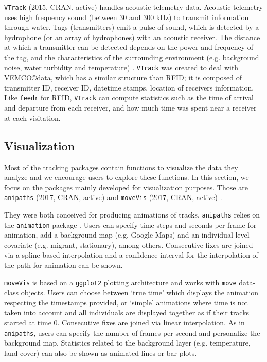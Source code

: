 \documentclass[a4paper,12pt]{article}
\newcommand{\Rpkg}[1]{\texttt{#1}}
\begin{document}
	\Rpkg{VTrack} (2015, CRAN, active) \citep{Campbell2012} handles acoustic telemetry data. Acoustic telemetry uses high frequency sound (between 30 and 300 kHz) to transmit information through water. Tags (transmitters) emit a pulse of sound, which is detected by a hydrophone (or an array of hydrophones) with an acoustic receiver. The distance at which a transmitter can be detected depends on the power and frequency of the tag, and the characteristics of the surrounding environment (e.g. background noise, water turbidity and temperature) \citep{Decelles2014}. \Rpkg{VTrack} was created to deal with VEMCO\copyright  data, which has a similar structure than RFID; it is composed of transmitter ID, receiver ID, datetime stamps, location of receivers information. Like \Rpkg{feedr} for RFID, \Rpkg{VTrack} can compute statistics such as the time of arrival and departure from each receiver, and how much time was spent near a receiver at each visitation.
	
	\subsection*{Visualization}
	
	Most of the tracking packages contain functions to visualize the data they analyze and we encourage users to explore these functions. 
	In this section, we focus on the packages mainly developed for visualization purposes. Those are \Rpkg{anipaths} (2017, CRAN, active) \citep{Ranipaths} and \Rpkg{moveVis} (2017, CRAN, active) \citep{RmoveVis}. 
	
	They were both conceived for producing animations of tracks. \Rpkg{anipaths} relies on the \Rpkg{animation} package \citep{Xie2013,Ranimation}. Users can specify time-steps and seconds per frame for animation, add a background map (e.g. Google Maps) and an individual-level covariate (e.g. migrant, stationary), among others. Consecutive fixes are joined via a spline-based interpolation and a confidence interval for the interpolation of the path for animation can be shown. 
	
	\Rpkg{moveVis} is based on a \Rpkg{ggplot2} \citep{Wickham2016} plotting architecture and works with \Rpkg{move} data-class objects. Users can choose between `true time' which displays the animation respecting the timestamps provided, or `simple' animations where time is not taken into account and all individuals are displayed together as if their tracks started at time 0. Consecutive fixes are joined via linear interpolation. As in \Rpkg{anipaths}, users can specify the number of frames per second and personalize the background map. Statistics related to the background layer (e.g. temperature, land cover) can also be shown as animated lines or bar plots. 
	
\end{document}
